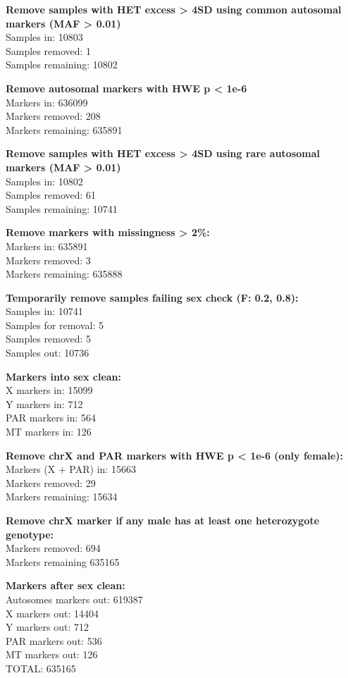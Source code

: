 \documentclass[]{article}
\begin{document}
\textbf{Remove samples with HET excess \textgreater{} 4SD using common
autosomal markers (MAF \textgreater{} 0.01)}\\
Samples in: 10803\\
Samples removed: 1\\
Samples remaining: 10802

\textbf{Remove autosomal markers with HWE p \textless{} 1e-6}\\
Markers in: 636099\\
Markers removed: 208\\
Markers remaining: 635891

\textbf{Remove samples with HET excess \textgreater{} 4SD using rare
autosomal markers (MAF \textgreater{} 0.01)}\\
Samples in: 10802\\
Samples removed: 61\\
Samples remaining: 10741

\textbf{Remove markers with missingness \textgreater{} 2\%:}\\
Markers in: 635891\\
Markers removed: 3\\
Markers remaining: 635888

\textbf{Temporarily remove samples failing sex check (F: 0.2, 0.8):}\\
Samples in: 10741\\
Samples for removal: 5\\
Samples removed: 5\\
Samples out: 10736

\textbf{Markers into sex clean:}\\
X markers in: 15099\\
Y markers in: 712\\
PAR markers in: 564\\
MT markers in: 126

\textbf{Remove chrX and PAR markers with HWE p \textless{} 1e-6 (only
female):}\\
Markers (X + PAR) in: 15663\\
Markers removed: 29\\
Markers remaining: 15634

\textbf{Remove chrX marker if any male has at least one heterozygote
genotype:}\\
Markers removed: 694\\
Markers remaining 635165

\textbf{Markers after sex clean:}\\
Autosomes markers out: 619387\\
X markers out: 14404\\
Y markers out: 712\\
PAR markers out: 536\\
MT markers out: 126\\
TOTAL: 635165
\end{document}
